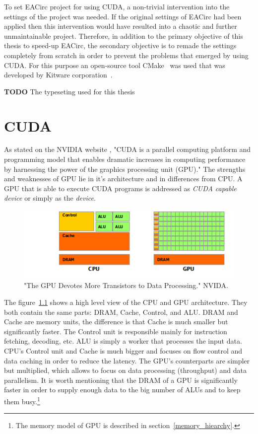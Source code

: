 \documentclass[12pt,oneside]{fithesis2}
\newcommand{\todo}{
	\noindent
	{\large\color{red}\textbf{TODO}}
}
\begin{document}
\bigskip

To set EACirc project for using CUDA, a non-trivial intervention into the settings of the project was needed. If the original settings of EACirc had been applied then this intervention would have resulted into a chaotic and further unmaintainable project. Therefore, in addition to the primary objective of this thesis to speed-up EACirc, the secondary objective is to remade the settings completely from scratch in order to prevent the problems that emerged by using CUDA. For this purpose an open-source tool CMake~\cite{cmake} was used that was developed by Kitware corporation~\cite{kitware}.

\bigskip
\todo{The typeseting used for this thesis}





\chapter{CUDA}
As stated on the NVIDIA website \cite{about_cuda}, "CUDA is a parallel computing platform and programming model that enables dramatic increases in computing performance by harnessing the power of the graphics processing unit (GPU)." The strengths and weaknesses of GPU lie in it's architecture and in differences from CPU. A GPU that is able to execute CUDA programs is addressed as \emph{CUDA capable device} or simply as the \emph{device}.

\begin{figure}[H]
	\centering
	\includegraphics{figures/gpu-devotes-more-transistors-to-data-processing.png}
	\caption{"The GPU Devotes More Transistors to Data Processing." NVIDA. \cite{cuda_guide}}
	\label{fig:cpu_vs_gpu_arch}
\end{figure}

The figure~\ref{fig:cpu_vs_gpu_arch} shows a high level view of the CPU and GPU architecture. They both contain the same parts: DRAM, Cache, Control, and ALU. DRAM and Cache are memory units, the difference is that Cache is much smaller but significantly faster. The Control unit is responsible mainly for instruction fetching, decoding, etc. ALU is simply a worker that processes the input data. CPU's Control unit and Cache is much bigger and focuses on flow control and data caching in order to reduce the latency. The GPU's counterparts are simpler but multiplied, which allows to focus on data processing (throughput) and data parallelism. It is worth mentioning that the DRAM of a GPU is significantly faster in order to supply enough data to the big number of ALUs and to keep them busy.\footnote{The memory model of GPU is described in section~\ref{memory_hiearchy}.}
\end{document}
